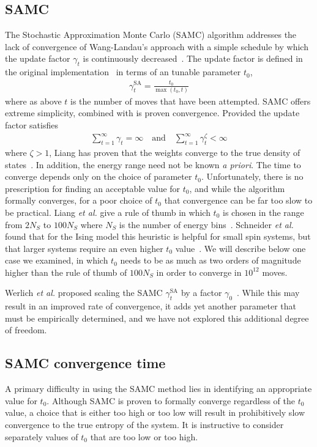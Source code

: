 \documentclass[letterpaper,twocolumn,amsmath,amssymb,pre,aps,10pt]{revtex4-1}
\begin{document}
\subsection{SAMC}
The Stochastic Approximation Monte Carlo (SAMC) algorithm addresses the lack of
convergence of Wang-Landau's approach with a simple schedule by which the update
factor $\gamma_t$ is continuously decreased~\cite{liang2007stochastic,
werlich2015stochastic, schneider2017convergence}.  The update factor is defined
in the original implementation~\cite{liang2007stochastic} in terms of an tunable
parameter $t_0$,
\begin{align}
\gamma_{t}^{\text{SA}} =\frac{t_0}{\max(t_0,t)}\label{eq:1}
\end{align}
where as above $t$ is the number of moves that have been attempted.
SAMC offers extreme simplicity, combined with is proven convergence.
Provided the update factor satisfies
\begin{align}
\sum_{t=1}^\infty \gamma_{t} = \infty \quad\textrm{and}\quad
\sum_{t=1}^\infty \gamma_{t}^\zeta < \infty
\end{align}
where $\zeta > 1$, Liang has proven that the weights converge to the true
density of states~\cite{liang2006theory, liang2007stochastic,
liang2009improving}.  In addition, the energy range need not be known \emph{a priori}.
The time to converge depends only on the choice of parameter $t_0$.
Unfortunately, there is no prescription for finding an acceptable value for
$t_0$, and while the algorithm formally converges, for a poor choice of $t_0$
that convergence can be far too slow to be practical. Liang \emph{et al.} give a
rule of thumb in which $t_0$ is chosen in the range from $2N_S$ to $100N_S$
where $N_S$ is the number of energy bins~\cite{liang2007stochastic}. Schneider
\emph{et al.} found that for the Ising model this heuristic is helpful for small
spin systems, but that larger systems require an even higher $t_0$
value~\cite{schneider2017convergence}.  We will describe below one case we
examined, in which $t_0$ needs to be as much as two orders of magnitude higher
than the rule of thumb of $100N_S$ in order to converge in $10^{12}$ moves.

Werlich \emph{et al.} proposed scaling the SAMC $\gamma_t^{\text{SA}}$
by a factor $\gamma_0$~\cite{werlich2015stochastic}.  While this may result in
an improved rate of convergence, it adds yet another parameter that must be
empirically determined, and we have not explored this additional degree of
freedom.

\subsection{SAMC convergence time}\label{sec:samc-convergence}
A primary difficulty in using the SAMC method lies in identifying an
appropriate value for $t_0$.  Although SAMC is proven to formally
converge regardless of the $t_0$ value, a choice that is either too
high or too low will result in prohibitively slow convergence to the true
entropy of the system.  It is instructive to consider separately
values of $t_0$ that are too low or too high.
\end{document}

